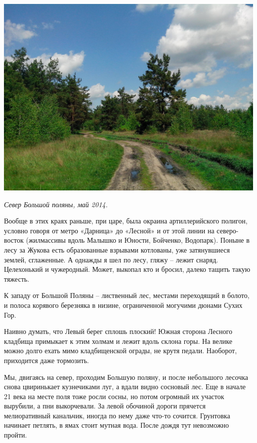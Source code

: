 \begin{center}
\includegraphics[width=\linewidth]{chast-gorodki/kolpit/s_IMG_20140513_115717.jpg}

\textit{Север Большой поляны, май 2014.}
\end{center}

Вообще в этих краях раньше, при царе, была окраина артиллерийского полигон, условно говоря от метро «Дарница» до «Лесной» и от этой линии на северо-восток (жилмассивы вдоль Малышко и Юности, Бойченко, Водопарк). Поныне в лесу за Жукова есть образованные взрывами котлованы, уже затянувшиеся землей, сглаженные. А однажды я шел по лесу, гляжу – лежит снаряд. Целехонький и чужеродный. Может, выкопал кто и бросил, далеко тащить такую тяжесть.

К западу от Большой Поляны – лиственный лес, местами переходящий в болото, и полоса корявого березняка в низине, ограниченной могучими дюнами Сухих Гор.

Наивно думать, что Левый берег сплошь плоский! Южная сторона Лесного кладбища примыкает к этим холмам и лежит вдоль склона горы. На велике можно долго ехать мимо кладбищенской ограды, не крутя педали. Наоборот, приходится даже тормозить.
 
Мы, двигаясь на север, проходим Большую поляну, и после небольшого лесочка снова цвиринькает кузнечиками луг, а вдали видно сосновый лес. Еще в начале 21 века на месте поля тоже росли сосны, но потом огромный их участок вырубили, а пни выкорчевали. За левой обочиной дороги прячется мелиоративный канальчик, иногда по нему даже что-то сочится. Грунтовка начинает петлять, в ямах стоит мутная вода. После дождя тут невозможно пройти.

